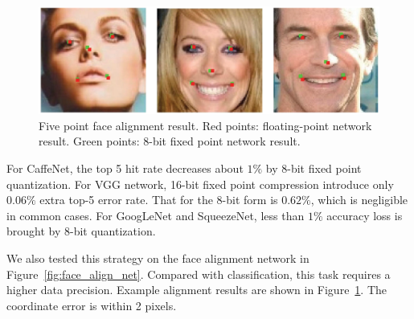 \documentclass[10pt, conference, compsocconf]{IEEEtran}
\begin{document}
\begin{figure}[t]
  \centering
  \includegraphics[width=1.0\columnwidth]{figure/alignment_result.eps}
  \small
  \vspace{-10pt}
  \caption{Five point face alignment result. Red points: floating-point network result. Green points: 8-bit fixed point network result.}
  \vspace{-10pt}
  \label{fig:face_align_res}
\end{figure}
For CaffeNet, the top 5 hit rate decreases about $1\%$ by 8-bit fixed point quantization. For VGG network, 16-bit fixed point compression introduce only $0.06\%$ extra top-5 error rate. That for the 8-bit form is $0.62\%$, which is negligible in common cases. For GoogLeNet and SqueezeNet, less than $1\%$ accuracy loss is brought by 8-bit quantization.

We also tested this strategy on the face alignment network in Figure~\ref{fig:face_align_net}. Compared with classification, this task requires a higher data precision. Example alignment results are shown in Figure~\ref{fig:face_align_res}. The coordinate error is within 2 pixels.
\end{document}
